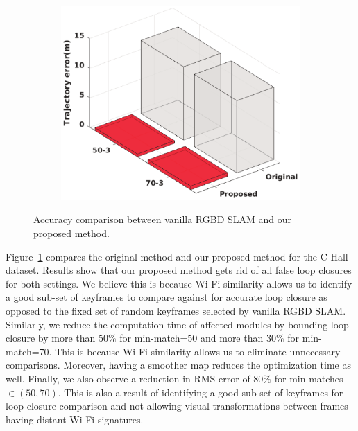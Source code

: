 \begin{figure}
\begin{subfigure}[b]{0.3\textwidth}
	\end{subfigure}
	\begin{subfigure}[b]{0.3\textwidth}
		\includegraphics[width=\textwidth]{Figure8_c.eps}
	\end{subfigure}
\caption{Accuracy comparison between vanilla RGBD SLAM and our proposed method.}
\label{fig:RGBDW_comparison}
\end{figure}
Figure~\ref{fig:RGBDW_comparison} compares the original method and our proposed method for the C Hall dataset.
Results show that our proposed method gets rid of all false loop closures for both settings.%
We believe this is because Wi-Fi similarity allows us to identify a good sub-set of keyframes to compare against for accurate loop closure as opposed to the fixed set of random keyframes selected by vanilla RGBD SLAM. 
Similarly, we reduce the computation time of affected modules by {bounding loop closure} by more than $50\%$ for {min-match}=50 and more than $30\%$ for {min-match}=70. 
This is because Wi-Fi similarity allows us to eliminate unnecessary comparisons. 
Moreover, having a smoother map reduces the optimization time as well. 
Finally, we also observe a reduction in RMS error of $80\%$ for min-matches $\in (50, 70)$. 
This is also a result of identifying a good sub-set of keyframes for loop closure comparison and not allowing visual transformations between frames having distant Wi-Fi signatures. 

